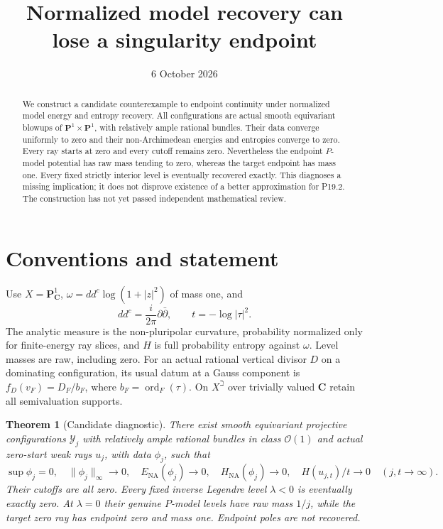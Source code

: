 \documentclass[11pt]{article}
\title{Normalized model recovery can lose a singularity endpoint}
\author{}
\date{6 October 2026}
\newcommand{\NA}{\mathrm{NA}}
\newcommand{\ord}{\operatorname{ord}}
\newtheorem{theorem}{Theorem}
\begin{document}
\maketitle
\begin{abstract}
We construct a candidate counterexample to endpoint continuity under
normalized model energy and entropy recovery. All configurations are
actual smooth equivariant blowups of $\mathbf P^1\times\mathbf P^1$,
with relatively ample rational bundles. Their data converge uniformly
to zero and their non-Archimedean energies and entropies converge to
zero. Every ray starts at zero and every cutoff remains zero. Nevertheless
the endpoint $P$-model potential has raw mass tending to zero, whereas
the target endpoint has mass one. Every fixed strictly interior level
is eventually recovered exactly. This diagnoses a missing implication;
it does not disprove existence of a better approximation for P19.2.
The construction has not yet passed independent mathematical review.
\end{abstract}

\section{Conventions and statement}
Use $X=\mathbf P^1_{\mathbf C}$,
$\omega=dd^c\log(1+|z|^2)$ of mass one, and
\[
 dd^c=\frac{i}{2\pi}\partial\bar\partial,\qquad
 t=-\log|\tau|^2 .                                      \tag{1}
\]
The analytic measure is the non-pluripolar curvature, probability
normalized only for finite-energy ray slices, and $H$ is full probability
entropy against $\omega$. Level masses are raw, including zero.
For an actual rational vertical divisor $D$ on a dominating configuration,
its usual datum at a Gauss component is $f_D(v_F)=D_F/b_F$,
where $b_F=\ord_F(\tau)$. On $X^\beth$ over trivially valued
$\mathbf C$ retain all semivaluation supports.

\begin{theorem}[Candidate diagnostic]
There exist smooth equivariant projective configurations $\mathcal Y_j$
with relatively ample rational bundles in class $\mathcal O(1)$ and
actual zero-start weak rays $u_j$, with data $\phi_j$, such that
\[
 \sup\phi_j=0,\quad \|\phi_j\|_\infty\to0,\quad
 E_\NA(\phi_j)\to0,\quad H_\NA(\phi_j)\to0,
 \quad H(u_{j,t})/t\to0\quad(j,t\to\infty).               \tag{2}
\]
Their cutoffs are all zero. Every fixed inverse Legendre level
$\lambda<0$ is eventually exactly zero. At $\lambda=0$ their genuine
$P$-model levels have raw mass $1/j$, while the target zero ray has
endpoint zero and mass one. Endpoint poles are not recovered.
\end{theorem}
\end{document}
